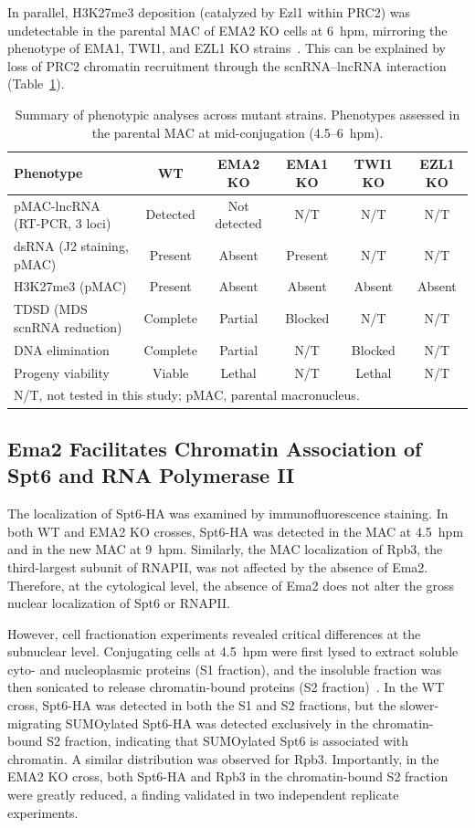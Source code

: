 \documentclass[12pt]{article}
\begin{document}
In parallel, H3K27me3 deposition (catalyzed by Ezl1 within PRC2) was undetectable in the parental MAC of EMA2 KO cells at 6~hpm, mirroring the phenotype of EMA1, TWI1, and EZL1 KO strains~\citep{Liu2007}.
This can be explained by loss of PRC2 chromatin recruitment through the scnRNA--lncRNA interaction (Table~\ref{tab:phenotype_summary}).

\begin{table}[htbp]
\centering
\caption{Summary of phenotypic analyses across mutant strains. Phenotypes assessed in the parental MAC at mid-conjugation (4.5--6~hpm).}
\label{tab:phenotype_summary}
\begin{tabular}{lccccc}
\toprule
\textbf{Phenotype} & \textbf{WT} & \textbf{EMA2 KO} & \textbf{EMA1 KO} & \textbf{TWI1 KO} & \textbf{EZL1 KO} \\
\midrule
pMAC-lncRNA (RT-PCR, 3 loci) & Detected & Not detected & N/T & N/T & N/T \\
dsRNA (J2 staining, pMAC) & Present & Absent & Present & N/T & N/T \\
H3K27me3 (pMAC) & Present & Absent & Absent & Absent & Absent \\
TDSD (MDS scnRNA reduction) & Complete & Partial & Blocked & N/T & N/T \\
DNA elimination & Complete & Partial & N/T & Blocked & N/T \\
Progeny viability & Viable & Lethal & N/T & Lethal & N/T \\
\bottomrule
\multicolumn{6}{l}{\footnotesize N/T, not tested in this study; pMAC, parental macronucleus.}
\end{tabular}
\end{table}

\subsection{Ema2 Facilitates Chromatin Association of Spt6 and RNA Polymerase II}

The localization of Spt6-HA was examined by immunofluorescence staining.
In both WT and EMA2 KO crosses, Spt6-HA was detected in the MAC at 4.5~hpm and in the new MAC at 9~hpm.
Similarly, the MAC localization of Rpb3, the third-largest subunit of RNAPII, was not affected by the absence of Ema2.
Therefore, at the cytological level, the absence of Ema2 does not alter the gross nuclear localization of Spt6 or RNAPII.

However, cell fractionation experiments revealed critical differences at the subnuclear level.
Conjugating cells at 4.5~hpm were first lysed to extract soluble cyto- and nucleoplasmic proteins (S1 fraction), and the insoluble fraction was then sonicated to release chromatin-bound proteins (S2 fraction)~\citep{Ali2018}.
In the WT cross, Spt6-HA was detected in both the S1 and S2 fractions, but the slower-migrating SUMOylated Spt6-HA was detected exclusively in the chromatin-bound S2 fraction, indicating that SUMOylated Spt6 is associated with chromatin.
A similar distribution was observed for Rpb3.
Importantly, in the EMA2 KO cross, both Spt6-HA and Rpb3 in the chromatin-bound S2 fraction were greatly reduced, a finding validated in two independent replicate experiments.
\end{document}
